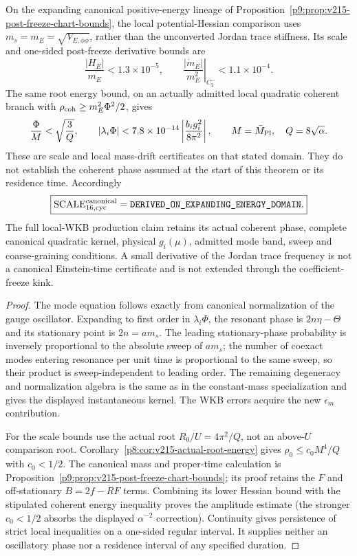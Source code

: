 \documentclass[12pt,a4paper]{article}
\begin{document}
\begin{theorem}
On the expanding canonical positive-energy lineage of
Proposition~\ref{p9:prop:v215-post-freeze-chart-bounds}, the local
potential-Hessian comparison uses $m_s=m_E=\sqrt{V_{E,\phi\phi}}$,
rather than the unconverted Jordan trace stiffness. Its scale and
one-sided post-freeze derivative bounds are
\[
 \frac{|H_E|}{m_E}<1.3\times10^{-5},\qquad
 \left.\frac{|\dot m_E|}{m_E^2}\right|_{C_2^-}<1.1\times10^{-4}.
\]
The same root energy bound, on an actually admitted local quadratic
coherent branch with $\rho_{\rm coh}\ge m_E^2\Phi^2/2$, gives
\[
 \frac{\Phi}{M}<\sqrt{\frac3Q},\qquad
 |\lambda_i\Phi|<7.8\times10^{-14}
              \left|\frac{b_i g_i^2}{8\pi^2}\right|,
 \qquad M=\bar M_{\rm Pl},\quad Q=8\sqrt\alpha.
\]
These are scale and local mass-drift certificates on that stated
domain. They do not establish the coherent phase assumed at the start
of this theorem or its residence time. Accordingly
\[
 \boxed{\mathrm{SCALE}^{\rm canonical}_{16,\rm cyc}
  =\texttt{DERIVED\_ON\_EXPANDING\_ENERGY\_DOMAIN}.}
\]
The full local-WKB production claim retains its actual coherent phase,
complete canonical quadratic kernel, physical $g_i(\mu)$, admitted
mode band, sweep and coarse-graining conditions. A small derivative
of the Jordan trace frequency is not a canonical Einstein-time
certificate and is not extended through the coefficient-freeze kink.
\end{theorem}

\begin{proof}
The mode equation follows exactly from canonical normalization of the gauge
oscillator.  Expanding to first order in $\lambda_i\Phi$, the resonant phase is
$2n\eta-\Theta$ and its stationary point is
$2n=a m_s$.  The leading stationary-phase probability is inversely
proportional to the absolute sweep of $a m_s$; the number of coexact modes
entering resonance per unit time is proportional to the same sweep, so their
product is sweep-independent to leading order.  The remaining degeneracy and
normalization algebra is the same as in the constant-mass specialization and
gives the displayed instantaneous kernel.  The WKB errors acquire the new
$\epsilon_m$ contribution.

For the scale bounds use the actual root
$R_0/U=4\pi^2/Q$, not an above-$U$ comparison root.
Corollary~\ref{p8:cor:v215-actual-root-energy} gives
$\rho_0\le c_0M^4/Q$ with $c_0<1/2$. The canonical mass and
proper-time calculation is
Proposition~\ref{p9:prop:v215-post-freeze-chart-bounds}; its proof
retains the $F$ and off-stationary $B=2f-RF$ terms.
Combining its lower Hessian bound with the stipulated coherent energy
inequality proves the amplitude estimate (the stronger $c_0<1/2$
absorbs the displayed $\alpha^{-2}$ correction). Continuity gives
persistence of strict local inequalities on a one-sided regular
interval. It supplies neither an oscillatory phase nor a residence
interval of any specified duration.
\end{proof}
\end{document}
